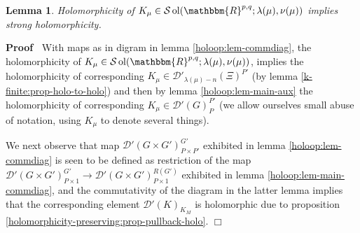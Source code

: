 \documentclass{article}
\newcommand{\tmop}[1]{\ensuremath{\operatorname{#1}}}
\newenvironment{proof}{\noindent\textbf{Proof\ }}{\hspace*{\fill}$\Box$\medskip}
\newtheorem{lemma}{Lemma}
\begin{document}
\begin{lemma}
  \label{holoop:lem-main}Holomorphicity of $K_{\mu} \in \mathcal{S} \tmop{ol}
  (\mathbbm{R}^{p, q} ; \lambda (\mu), \nu (\mu))$ implies strong
  holomorphicity.
\end{lemma}

\begin{proof}
  With maps as in digram in lemma \ref{holoop:lem-commdiag}, the
  holomorphicity of $K_{\mu} \in \mathcal{S} \tmop{ol} (\mathbbm{R}^{p, q} ;
  \lambda (\mu), \nu (\mu))$, implies the holomorphicity of corresponding
  $K_{\mu} \in \mathcal{D}'_{\lambda (\mu) - n} (\Xi)^{P'}$ (by lemma
  \ref{k-finite:prop-holo-to-holo}) and then by lemma
  \ref{holoop:lem-main-aux} the holomorphicity of corresponding $K_{\mu} \in
  \mathcal{D}' (G)_P^{P'}$ (we allow ourselves small abuse of notation, using
  $K_{\mu}$ to denote several things).
  
  We next observe that map $\mathcal{D}' (G \times G')_{P \times P'}^{G'}$
  exhibited in lemma \ref{holoop:lem-commdiag} is seen to be defined as
  restriction of the map $\mathcal{D}' (G \times G')_{P \times 1}^{G'}
  \rightarrow \mathcal{D}' (G \times G')_{P \times 1}^{R (G')}$ exhibited in
  lemma \ref{holoop:lem-main-commdiag}, and the commutativity of the diagram
  in the latter lemma implies that the corresponding element $\mathcal{D}'
  (K)_{K_M}$ is holomorphic due to proposition
  \ref{holomorphicity-preserving:prop-pullback-holo}.
\end{proof}
\end{document}
